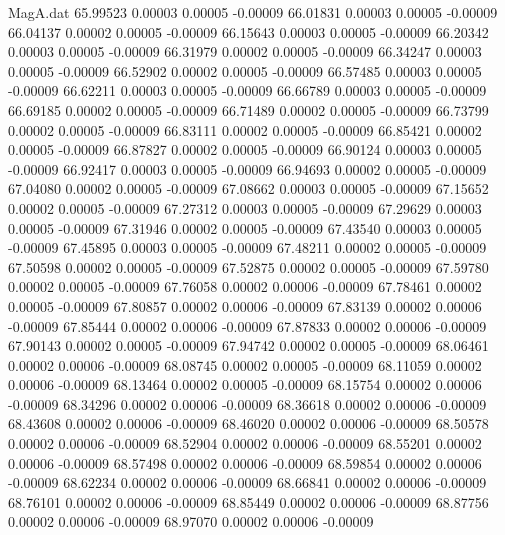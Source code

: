 \begin{filecontents}{MagA.dat}
  65.99523    0.00003    0.00005   -0.00009
  66.01831    0.00003    0.00005   -0.00009
  66.04137    0.00002    0.00005   -0.00009
  66.15643    0.00003    0.00005   -0.00009
  66.20342    0.00003    0.00005   -0.00009
  66.31979    0.00002    0.00005   -0.00009
  66.34247    0.00003    0.00005   -0.00009
  66.52902    0.00002    0.00005   -0.00009
  66.57485    0.00003    0.00005   -0.00009
  66.62211    0.00003    0.00005   -0.00009
  66.66789    0.00003    0.00005   -0.00009
  66.69185    0.00002    0.00005   -0.00009
  66.71489    0.00002    0.00005   -0.00009
  66.73799    0.00002    0.00005   -0.00009
  66.83111    0.00002    0.00005   -0.00009
  66.85421    0.00002    0.00005   -0.00009
  66.87827    0.00002    0.00005   -0.00009
  66.90124    0.00003    0.00005   -0.00009
  66.92417    0.00003    0.00005   -0.00009
  66.94693    0.00002    0.00005   -0.00009
  67.04080    0.00002    0.00005   -0.00009
  67.08662    0.00003    0.00005   -0.00009
  67.15652    0.00002    0.00005   -0.00009
  67.27312    0.00003    0.00005   -0.00009
  67.29629    0.00003    0.00005   -0.00009
  67.31946    0.00002    0.00005   -0.00009
  67.43540    0.00003    0.00005   -0.00009
  67.45895    0.00003    0.00005   -0.00009
  67.48211    0.00002    0.00005   -0.00009
  67.50598    0.00002    0.00005   -0.00009
  67.52875    0.00002    0.00005   -0.00009
  67.59780    0.00002    0.00005   -0.00009
  67.76058    0.00002    0.00006   -0.00009
  67.78461    0.00002    0.00005   -0.00009
  67.80857    0.00002    0.00006   -0.00009
  67.83139    0.00002    0.00006   -0.00009
  67.85444    0.00002    0.00006   -0.00009
  67.87833    0.00002    0.00006   -0.00009
  67.90143    0.00002    0.00005   -0.00009
  67.94742    0.00002    0.00005   -0.00009
  68.06461    0.00002    0.00006   -0.00009
  68.08745    0.00002    0.00005   -0.00009
  68.11059    0.00002    0.00006   -0.00009
  68.13464    0.00002    0.00005   -0.00009
  68.15754    0.00002    0.00006   -0.00009
  68.34296    0.00002    0.00006   -0.00009
  68.36618    0.00002    0.00006   -0.00009
  68.43608    0.00002    0.00006   -0.00009
  68.46020    0.00002    0.00006   -0.00009
  68.50578    0.00002    0.00006   -0.00009
  68.52904    0.00002    0.00006   -0.00009
  68.55201    0.00002    0.00006   -0.00009
  68.57498    0.00002    0.00006   -0.00009
  68.59854    0.00002    0.00006   -0.00009
  68.62234    0.00002    0.00006   -0.00009
  68.66841    0.00002    0.00006   -0.00009
  68.76101    0.00002    0.00006   -0.00009
  68.85449    0.00002    0.00006   -0.00009
  68.87756    0.00002    0.00006   -0.00009
  68.97070    0.00002    0.00006   -0.00009

\end{filecontents}
